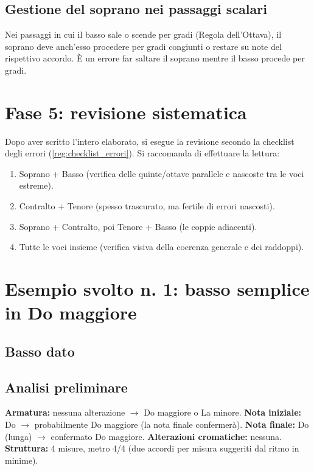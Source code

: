 \subsection{Gestione del soprano nei passaggi scalari}

Nei passaggi in cui il basso sale o scende per gradi (Regola dell'Ottava), il soprano deve anch'esso procedere per gradi congiunti o restare su note del rispettivo accordo. È un errore far saltare il soprano mentre il basso procede per gradi.

\section{Fase 5: revisione sistematica}
\label{sec:fase5_basso}

Dopo aver scritto l'intero elaborato, si esegue la revisione secondo la checklist degli errori (\ref{reg:checklist_errori}). Si raccomanda di effettuare la lettura:
\begin{enumerate}
	\item Soprano + Basso (verifica delle quinte/ottave parallele e nascoste tra le voci estreme).
	\item Contralto + Tenore (spesso trascurato, ma fertile di errori nascosti).
	\item Soprano + Contralto, poi Tenore + Basso (le coppie adiacenti).
	\item Tutte le voci insieme (verifica visiva della coerenza generale e dei raddoppi).
\end{enumerate}

\section{Esempio svolto n. 1: basso semplice in Do maggiore}
\label{sec:esempio1}

\subsection{Basso dato}

\subsection{Analisi preliminare}

\textbf{Armatura:} nessuna alterazione $\rightarrow$ Do maggiore o La minore.
\textbf{Nota iniziale:} Do $\rightarrow$ probabilmente Do maggiore (la nota finale confermerà).
\textbf{Nota finale:} Do (lunga) $\rightarrow$ confermato Do maggiore.
\textbf{Alterazioni cromatiche:} nessuna.
\textbf{Struttura:} 4 misure, metro 4/4 (due accordi per misura suggeriti dal ritmo in minime).

